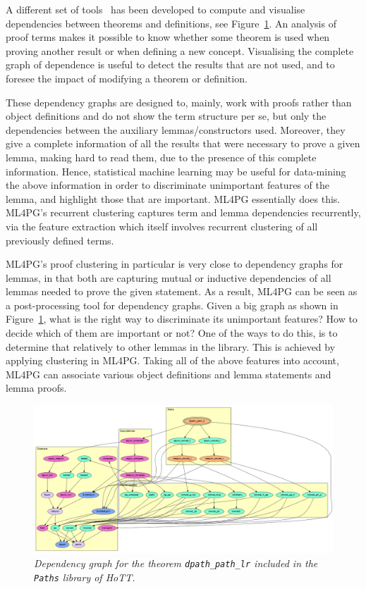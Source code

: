 A different set of tools~\cite{dpdgraph,BPP00} has been developed to compute and visualise dependencies between theorems and definitions, see Figure~\ref{fig:dgraph1}. An analysis of proof terms makes it possible to know whether some theorem is used when proving another result or when defining a new concept. Visualising the complete graph of dependence is useful to detect the results that are not used, and to foresee the impact of modifying a theorem or definition.

These dependency graphs are designed to, mainly, work with proofs rather than object definitions and do not show the term structure per se,
but only the dependencies between the auxiliary lemmas/constructors used. Moreover, they give a complete information of all the results that were necessary to prove a given lemma, making hard to read them, due to the presence of this complete information. Hence,  statistical machine learning may be useful for data-mining the above information in order to discriminate unimportant features of the
lemma, and highlight those that are important. ML4PG essentially does this. ML4PG's recurrent clustering  captures term and lemma dependencies recurrently, via the feature extraction which itself involves recurrent clustering of all previously
defined terms.


ML4PG's proof clustering in particular is very close to dependency graphs for lemmas, in that both are capturing mutual or inductive dependencies of all lemmas needed to prove the given statement. As a result, ML4PG can be seen as a post-processing tool for dependency
graphs. Given a big graph as shown in Figure~\ref{fig:dgraph1}, what is the right way to discriminate its unimportant features? How to decide which of them are important or not? One of the ways to do this, is to determine that relatively to other lemmas in the library. This is achieved by applying clustering in ML4PG. Taking all of the above features into account, ML4PG can associate various object definitions
and lemma statements and lemma proofs.

\begin{figure}
\centering
\includegraphics[scale=.15]{graph_dpath_path_lr.png}
\caption{\scriptsize{\emph{Dependency graph for the theorem \texttt{dpath\_path\_lr} included in the \texttt{Paths} library of HoTT.}}}\label{fig:dgraph1}
\end{figure}

